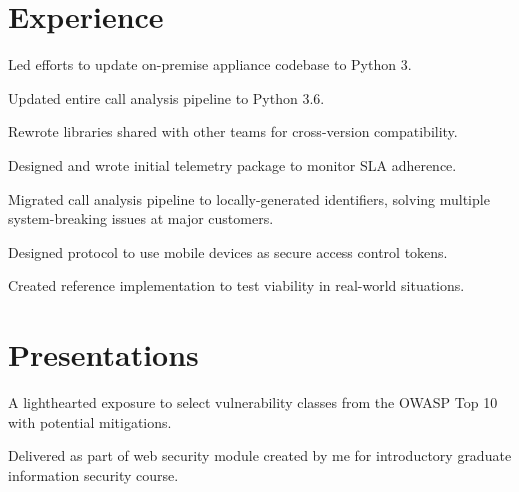 \documentclass[]{deedy-resume-openfont}
\begin{document}
\begin{minipage}[t]{0.64\textwidth} 


\section{Experience}
\vspace{\topsep} %
\begin{tightemize}
\item Led efforts to update on-premise appliance codebase to Python 3. 
\item Updated entire call analysis pipeline to Python 3.6.
\item Rewrote libraries shared with other teams for cross-version compatibility.
\item Designed and wrote initial telemetry package to monitor SLA adherence. 
\item Migrated call analysis pipeline to locally-generated identifiers, solving multiple system-breaking issues at major customers.
\end{tightemize}
\sectionsep

\begin{tightemize}
\item Designed protocol to use mobile devices as secure access control tokens.
\item Created reference implementation to test viability in real-world situations.
\end{tightemize}
\sectionsep


\section{Presentations} 
\begin{tightemize}
\item A lighthearted exposure to select vulnerability classes from the OWASP Top 10 with potential mitigations.
\item Delivered as part of web security module created by me for introductory graduate information security course.
\end{tightemize}
\sectionsep


\end{minipage}
\end{document}
